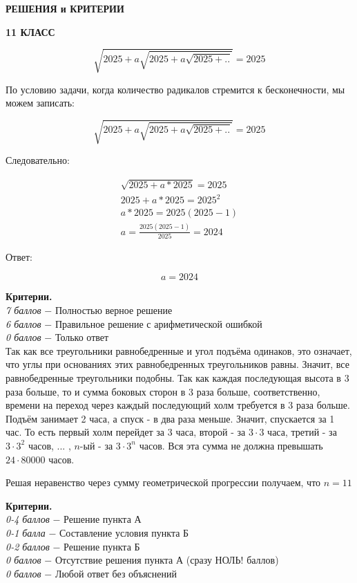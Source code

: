 \centerline{\bf \Large  РЕШЕНИЯ и КРИТЕРИИ}

\centerline{\bf \Large  11 КЛАСС}

 \par

$$
\sqrt{2025+a \sqrt{2025+a \sqrt{2025+. .}}}=2025
$$


По условию задачи, когда количество радикалов стремится к бесконечности, мы можем записать:

$$
\sqrt{2025+a \sqrt{2025+a \sqrt{2025+. .}}}=2025
$$


Следовательно:

$$
\begin{gathered}
\sqrt{2025+a * 2025}=2025 \\
2025+a * 2025=2025^2 \\
a * 2025=2025(2025-1) \\
a=\frac{2025(2025-1)}{2025}=2024
\end{gathered}
$$


Ответ:

$$
a=2024
$$


\textbf{Критерии.} \\
\textit{7 баллов} $-$ Полностью верное решение\\
\textit{6 баллов} $-$ Правильное решение с арифметической ошибкой\\
\textit{0 баллов} $-$ Только ответ\\

 Так как все треугольники равнобедренные и угол подъёма одинаков, это означает, что углы при основаниях этих равнобедренных треугольников равны. Значит, все равнобедренные треугольники подобны. Так как каждая последующая высота в 3 раза больше, то и сумма боковых сторон в 3 раза больше, соответственно, времени на переход через каждый последующий холм требуется в 3 раза больше. Подъём занимает 2 часа, а спуск - в два раза меньше. Значит, спускается за 1 час. То есть первый холм перейдет за 3 часа, второй - за $3\cdot3$ часа, третий - за $3\cdot3^2$ часов, ... , $n$-ый - за $3\cdot3^n$ часов. Вся эта сумма не должна превышать $24\cdot80000$ часов.

Решая неравенство через сумму геометрической прогрессии получаем, что $n=11$\par

\textbf{Критерии.} \\
\textit{0-4 баллов} $-$ Решение пункта А\\
\textit{0-1 балла} $-$ Составление условия пункта Б \\
\textit{0-2 баллов} $-$ Решение пункта Б\\
\textit{0 баллов} $-$ Отсутствие решения пункта А (сразу НОЛЬ! баллов)\\
\textit{0 баллов} $-$ Любой ответ без объяснений\\

